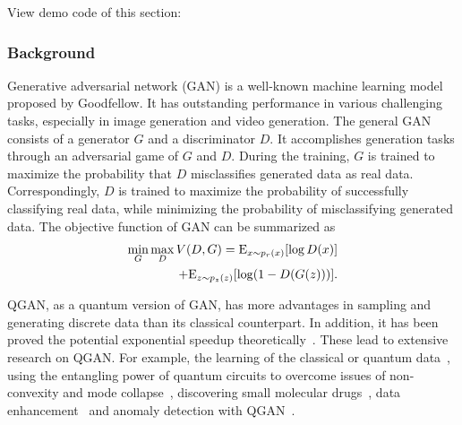 View demo code of this section: \href{https://gitee.com/mindspore/mindquantum/blob/research/paper_with_code/variational_quantum_circuits_enhanced_generative_adversarial_network/QGAN.py}{\color{ceruleanblue}{Gitee}} \ \href{https://github.com/donghufeng/mindquantum_tutorial_code/blob/master/whitepaper/code/chapt05/5.7_Q-GAN/QGAN.py}{\color{ceruleanblue}{GitHub}}

\subsubsection{Background}
Generative adversarial network (GAN) is a well-known machine learning model proposed by Goodfellow. It has outstanding performance in various challenging tasks, especially in image generation and video generation. The general GAN consists of a generator ${G}$ and a discriminator ${D}$. It accomplishes generation tasks through an adversarial game of ${G}$ and ${D}$. During the training, ${G}$ is trained to maximize the probability that ${D}$ misclassifies generated data as real data. Correspondingly, ${D}$ is trained to maximize the probability of successfully classifying real data, while minimizing the probability of misclassifying generated data. The objective function of GAN can be summarized as
\begin{equation}
  \begin{split}
    \mathop {\min }\limits_G \mathop {\max }\limits_D V(D,G) = {\rm{ }}{{\rm{E}}_{x\sim{p_r}(x)}}[\log D(x)]
    \\+ {{\rm{E}}_{z\sim{p_z}(z)}}[\log (1 - D(G(z)))]. \label{eq1}
  \end{split}
\end{equation}

QGAN, as a quantum version of GAN, has more advantages in sampling and generating discrete data than its classical counterpart. In addition, it has been proved the potential exponential speedup theoretically~\cite{lloyd2018quantum}. These lead to extensive research on QGAN. For example, the learning of the classical or quantum data~\cite{benedetti2019adversarial, zeng2019learning, zoufal2019quantum,ahmed2021quantum}, using the entangling power of quantum circuits to overcome issues of non-convexity and mode collapse~\cite{niu2022entangling}, discovering small molecular drugs~\cite{li2021quantum}, data enhancement~\cite{nakaji2021quantum} and anomaly detection with QGAN~\cite{herr2021anomaly}.

